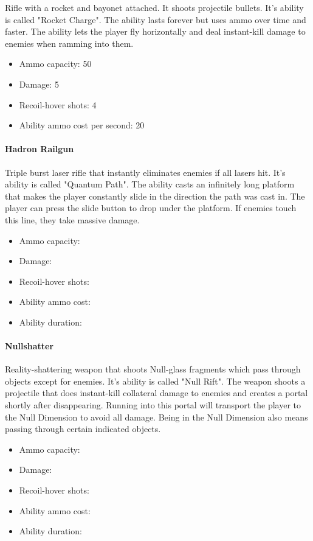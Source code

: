 \documentclass[12pt]{article}
\begin{document}
Rifle with a rocket and bayonet attached. It shoots projectile bullets. It's ability is called "Rocket Charge". The ability lasts forever but uses ammo over time and faster. The ability lets the player fly horizontally and deal instant-kill damage to enemies when ramming into them.

\begin{itemize}
	\item Ammo capacity: 50
	\item Damage: 5
	\item Recoil-hover shots: 4
	\item Ability ammo cost per second: 20
\end{itemize} 


\paragraph{Hadron Railgun}

Triple burst laser rifle that instantly eliminates enemies if all lasers hit. It's ability is called "Quantum Path". The ability casts an infinitely long platform that makes the player constantly slide in the direction the path was cast in. The player can press the slide button to drop under the platform. If enemies touch this line, they take massive damage. 


\begin{itemize}
	\item Ammo capacity: 
	\item Damage: 
	\item Recoil-hover shots: 
	\item Ability ammo cost: 
	\item Ability duration: 
\end{itemize}


\paragraph{Nullshatter}

Reality-shattering weapon that shoots Null-glass fragments which pass through objects except for enemies. It's ability is called "Null Rift". The weapon shoots a projectile that does instant-kill collateral damage to enemies and creates a portal shortly after disappearing. Running into this portal will transport the player to the Null Dimension to avoid all damage. Being in the Null Dimension also means passing through certain indicated objects. 

\begin{itemize}
	\item Ammo capacity: 
	\item Damage: 
	\item Recoil-hover shots: 
	\item Ability ammo cost: 
	\item Ability duration: 
\end{itemize}
\end{document}
